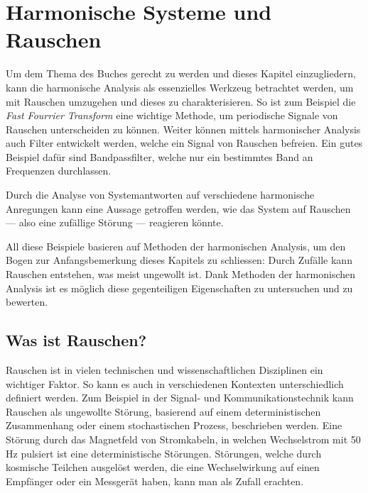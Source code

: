 %
%
%
%

\section{Harmonische Systeme und Rauschen\label{brown:Rauschen}}

Um dem Thema des Buches gerecht zu werden und dieses Kapitel einzugliedern, kann die harmonische Analysis als essenzielles Werkzeug betrachtet werden, um mit Rauschen umzugehen und dieses zu charakterisieren. 
So ist zum Beispiel die \textit{Fast Fourrier Transform} eine wichtige Methode, um periodische Signale von Rauschen unterscheiden zu können. Weiter können mittels harmonischer Analysis auch Filter entwickelt werden, welche ein Signal von Rauschen befreien. Ein gutes Beispiel dafür sind Bandpassfilter, welche nur ein bestimmtes Band an Frequenzen durchlassen.


Durch die Analyse von Systemantworten auf verschiedene harmonische Anregungen kann eine Aussage getroffen werden, wie das System auf Rauschen --- also eine zufällige Störung --- reagieren könnte.


All diese Beispiele basieren auf Methoden der harmonischen Analysis, um den Bogen zur Anfangsbemerkung dieses Kapitels zu schliessen: Durch Zufälle kann Rauschen entstehen, was meist ungewollt ist. Dank Methoden der harmonischen Analysis ist es möglich diese gegenteiligen Eigenschaften zu untersuchen und zu bewerten.


\subsection{Was ist Rauschen?\label{brown:Rauschen:Arten}}
Rauschen ist in vielen technischen und wissenschaftlichen Disziplinen ein wichtiger Faktor. So kann es auch in verschiedenen Kontexten unterschiedlich definiert werden. Zum Beispiel in der Signal- und Kommunikationstechnik kann Rauschen als ungewollte Störung, basierend auf einem deterministischen Zusammenhang oder einem stochastischen Prozess, beschrieben werden. Eine Störung durch das Magnetfeld von Stromkabeln, in welchen Wechselstrom mit 50 Hz pulsiert ist eine deterministische Störungen. Störungen, welche durch kosmische Teilchen ausgelöst werden, die eine Wechselwirkung auf einen Empfänger oder ein Messgerät haben, kann man als Zufall erachten.

